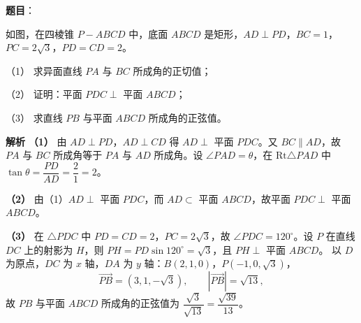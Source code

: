 \begin{answer}

\textbf{题目}：

如图，在四棱锥 $P-ABCD$ 中，底面 $ABCD$ 是矩形，$AD\perp PD$，$BC=1$，$PC=2\sqrt3$，$PD=CD=2$。

（1） 求异面直线 $PA$ 与 $BC$ 所成角的正切值；

（2） 证明：平面 $PDC\perp$ 平面 $ABCD$；

（3） 求直线 $PB$ 与平面 $ABCD$ 所成角的正弦值。
\nopagebreak[4]
\begin{center}\end{center}
\nopagebreak[4]
\textbf{解析}
\textbf{（1）} 由 $AD\perp PD$，$AD\perp CD$ 得 $AD\perp$ 平面 $PDC$。又 $BC\parallel AD$，故 $PA$ 与 $BC$ 所成角等于 $PA$ 与 $AD$ 所成角。设 $\angle PAD=\theta$，在 $\mathrm{Rt}\triangle PAD$ 中 $\tan\theta=\dfrac{PD}{AD}=\dfrac21=2$。

\textbf{（2）} 由（1）$AD\perp$ 平面 $PDC$，而 $AD\subset$ 平面 $ABCD$，故平面 $PDC\perp$ 平面 $ABCD$。

\textbf{（3）} 在 $\triangle PDC$ 中 $PD=CD=2$，$PC=2\sqrt3$，故 $\angle PDC=120^\circ$。设 $P$ 在直线 $DC$ 上的射影为 $H$，则 $PH=PD\sin120^\circ=\sqrt3$，且 $PH\perp$ 平面 $ABCD$。
以 $D$ 为原点，$DC$ 为 $x$ 轴，$DA$ 为 $y$ 轴：$B(2,1,0)$，$P(-1,0,\sqrt3)$，
\nopagebreak[4]
\[\overrightarrow{PB}=(3,1,-\sqrt3),\qquad |\overrightarrow{PB}|=\sqrt{13},\]
故 $PB$ 与平面 $ABCD$ 所成角的正弦值为 $\dfrac{\sqrt3}{\sqrt{13}}=\dfrac{\sqrt{39}}{13}$。




\end{answer}
